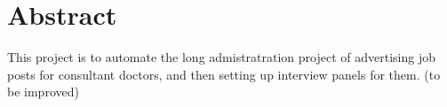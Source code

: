 \section*{\centering Abstract}
This project is to automate the long admistratration project of advertising job posts for consultant doctors, and then setting up interview panels for them. (to be improved)